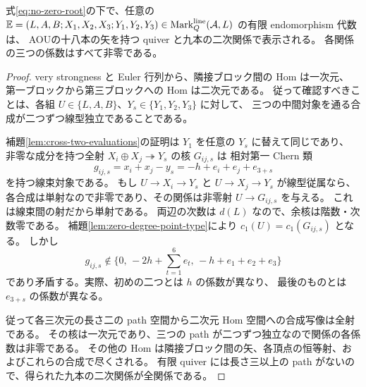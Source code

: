 \begin{lemma}\label{lem:rootfree-aou-presentation}
式\eqref{eq:no-zero-root}の下で、任意の
$\mathbb E=(L,A,B;X_1,X_2,X_3;Y_1,Y_2,Y_3)
\in\operatorname{Mark}^{\rm line}_Q(\mathcal A,L)$ の有限 endomorphism 代数は、
AOU\cite[\S4.2, (4.2)]{AOU}の十八本の矢を持つ quiver と九本の二次関係で表示される。
各関係の三つの係数はすべて非零である。
\end{lemma}
\begin{proof}
very strongness と Euler 行列から、隣接ブロック間の Hom は一次元、
第一ブロックから第三ブロックへの Hom は二次元である。
従って確認すべきことは、各組
$U\in\{L,A,B\}$、$Y_s\in\{Y_1,Y_2,Y_3\}$ に対して、
三つの中間対象を通る合成が二つずつ線型独立であることである。

補題\ref{lem:cross-two-evaluations}の証明は $Y_1$ を任意の $Y_s$ に替えて同じであり、
非零な成分を持つ全射 $X_i\oplus X_j\twoheadrightarrow Y_s$ の核 $G_{ij,s}$ は
相対第一 Chern 類
\[
 g_{ij,s}=x_i+x_j-y_s=-h+e_i+e_j+e_{3+s}
\]
を持つ線束対象である。
もし $U\to X_i\to Y_s$ と $U\to X_j\to Y_s$ が線型従属なら、
各合成は単射なので非零であり、その関係は非零射 $U\to G_{ij,s}$ を与える。
これは線束間の射だから単射である。
両辺の次数は $d(L)$ なので、余核は階数・次数零である。
補題\ref{lem:zero-degree-point-type}により $c_1(U)=c_1(G_{ij,s})$ となる。
しかし
\[
 g_{ij,s}\notin\{0,\,-2h+\textstyle\sum_{t=1}^6e_t,\,
                    -h+e_1+e_2+e_3\}
\]
であり矛盾する。実際、初めの二つとは $h$ の係数が異なり、
最後のものとは $e_{3+s}$ の係数が異なる。

従って各三次元の長さ二の path 空間から二次元 Hom 空間への合成写像は全射である。
その核は一次元であり、三つの path が二つずつ独立なので関係の各係数は非零である。
その他の Hom は隣接ブロック間の矢、各頂点の恒等射、およびこれらの合成で尽くされる。
有限 quiver には長さ三以上の path がないので、得られた九本の二次関係が全関係である。
\end{proof}

